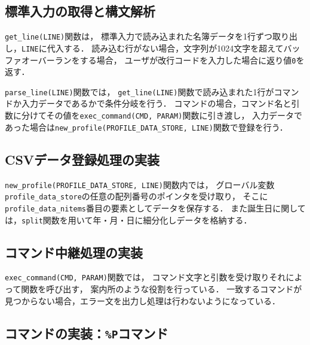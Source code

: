 \documentclass[autodetect-engine,dvi=dvipdfmx,ja=standard,
               a4j,11pt]{bxjsarticle}
\begin{document}
\subsection{標準入力の取得と構文解析}

\verb|get_line(LINE)|関数は，
標準入力で読み込まれた名簿データを1行ずつ取り出し，\verb|LINE|に代入する．
読み込む行がない場合，文字列が1024文字を超えてバッファオーバーランをする場合，
ユーザが改行コードを入力した場合に返り値\verb|0|を返す．

\verb|parse_line(LINE)|関数では，
\verb|get_line(LINE)|関数で読み込まれた1行がコマンドか入力データであるかで条件分岐を行う．
コマンドの場合，コマンド名と引数に分けてその値を\verb|exec_command(CMD, PARAM)|関数に引き渡し，
入力データであった場合は\verb|new_profile(PROFILE_DATA_STORE, LINE)|関数で登録を行う．

\subsection{CSVデータ登録処理の実装}

\verb|new_profile(PROFILE_DATA_STORE, LINE)|関数内では，
グローバル変数\verb|profile_data_store|の任意の配列番号のポインタを受け取り，
そこに\verb|profile_data_nitems|番目の要素としてデータを保存する．
また誕生日に関しては，\verb|split|関数を用いて年・月・日に細分化しデータを格納する．

\subsection{コマンド中継処理の実装}

\verb|exec_command(CMD, PARAM)|関数では，
コマンド文字と引数を受け取りそれによって関数を呼び出す，
案内所のような役割を行っている．
一致するコマンドが見つからない場合，エラー文を出力し処理は行わないようになっている．

\subsection{コマンドの実装：\texttt{\%P}コマンド}
\end{document}
